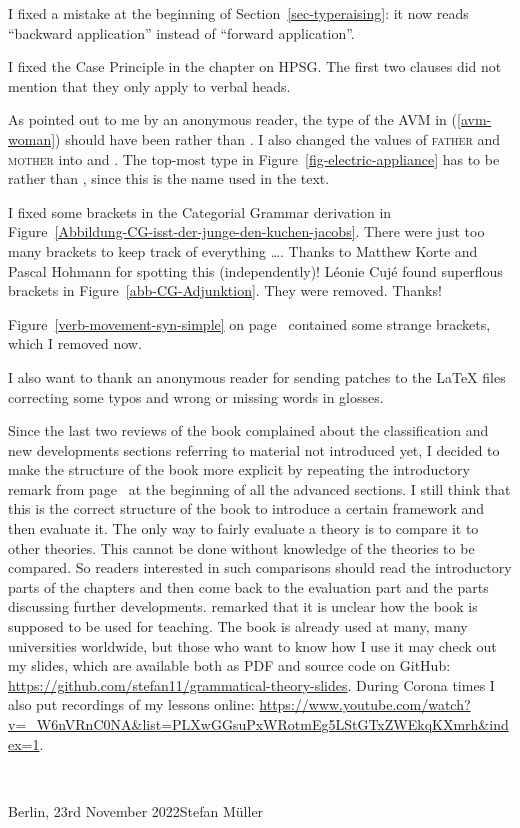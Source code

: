 I fixed a mistake at the beginning of Section~\ref{sec-typeraising}: it now reads ``backward
application'' instead of ``forward application''.

I fixed the Case Principle in the chapter on HPSG. The first two clauses did not mention that they
only apply to verbal heads.

As pointed out to me by an anonymous reader, the type of the AVM in (\ref{avm-woman}) should have
been  rather than . I also changed the values of \textsc{father} and \textsc{mother}
into  and . The top-most type in Figure~\ref{fig-electric-appliance} has to be
 rather than , since this is the name used in the text.

I fixed some brackets in the Categorial Grammar derivation in Figure~\ref{Abbildung-CG-isst-der-junge-den-kuchen-jacobs}. There were
just too many brackets to keep track of everything \ldots. Thanks to Matthew Korte and Pascal
Hohmann for spotting this (independently)!
Léonie Cujé found superflous brackets in Figure~\ref{abb-CG-Adjunktion}. They were removed. Thanks!

Figure~\ref{verb-movement-syn-simple} on page~\pageref{verb-movement-syn-simple} contained some strange brackets, which I removed now.

I also want to thank an anonymous reader for sending patches to the \LaTeX{} files correcting some
typos and wrong or missing words in glosses.

Since the last two reviews of the book complained about the classification and new developments
sections referring to material not introduced yet, I decided to make the structure of the book more
explicit by repeating the introductory remark from page~\pageref{page:structure-of-book} at the
beginning of all the advanced sections. I still think that this is the correct structure of the book to introduce a
certain framework and then evaluate it. The only way to fairly evaluate a theory is to compare it to
other theories. This cannot be done without knowledge of the theories to be compared. So readers
interested in such comparisons should read the introductory parts of the chapters and then come back
to the evaluation part and the parts discussing further developments. \citet{Culicover2021a}
remarked that it is unclear how the book is supposed to be used for teaching. The book is already
used at many, many universities worldwide, but those who want to know how I use it may check out my
slides, which are available both as PDF and source code on GitHub:
\url{https://github.com/stefan11/grammatical-theory-slides}. During Corona times I also put
recordings of my lessons online: \url{https://www.youtube.com/watch?v=_W6nVRnC0NA&list=PLXwGGsuPxWRotmEg5LStGTxZWEkqKXmrh&index=1}.

~\medskip

\noindent
Berlin, 23rd November 2022\hfill Stefan Müller



